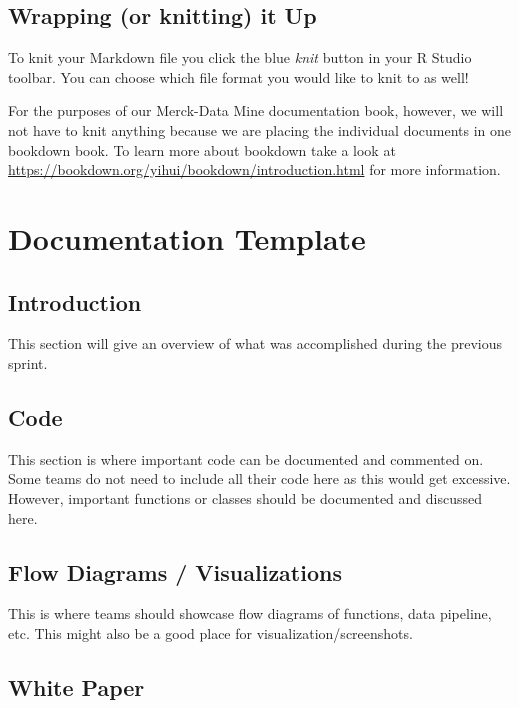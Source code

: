 \documentclass[]{book}
\begin{document}
\section{Wrapping (or knitting) it Up}\label{wrapping-or-knitting-it-up}

To knit your Markdown file you click the blue \emph{knit} button in your
R Studio toolbar. You can choose which file format you would like to
knit to as well!

For the purposes of our Merck-Data Mine documentation book, however, we
will not have to knit anything because we are placing the individual
documents in one bookdown book. To learn more about bookdown take a look
at \url{https://bookdown.org/yihui/bookdown/introduction.html} for more
information.

\chapter{Documentation Template}\label{documentation-template}

\section{Introduction}\label{introduction-1}

This section will give an overview of what was accomplished during the
previous sprint.

\section{Code}\label{code}

This section is where important code can be documented and commented on.
Some teams do not need to include all their code here as this would get
excessive. However, important functions or classes should be documented
and discussed here.

\section{Flow Diagrams /
Visualizations}\label{flow-diagrams-visualizations}

This is where teams should showcase flow diagrams of functions, data
pipeline, etc. This might also be a good place for
visualization/screenshots.

\section{White Paper}\label{white-paper}
\end{document}
